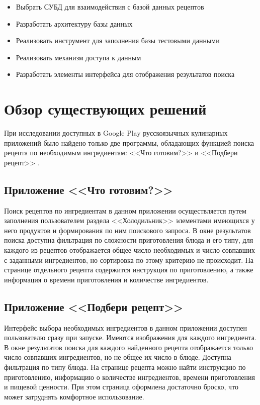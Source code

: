 \documentclass[14pt]{matmex-diploma-custom}
\begin{document}
\begin{itemize}  
\item Выбрать СУБД для взаимодействия с базой данных рецептов
\item Разработать архитектуру базы данных
\item Реализовать инструмент для заполнения базы тестовыми данными
\item Реализовать механизм доступа к данным
\item Разработать элементы интерфейса для отображения результатов поиска
\end{itemize}

\section*{Обзор существующих решений}
При исследовании доступных в Google Play русскоязычных кулинарных приложений было найдено только две программы, обладающих функцией поиска рецепта по необходимым ингредиентам: <<Что готовим?>> \cite{chtogotovim} и <<Подбери рецепт>> \cite{podberi}.
\subsection*{Приложение <<Что готовим?>>}
Поиск рецептов по ингредиентам в данном приложении осуществляется путем заполнения пользователем раздела <<Холодильник>> элементами имеющихся у него продуктов и формирования по ним поискового запроса. В окне результатов поиска доступна фильтрация по сложности приготовления блюда и его типу, для каждого из рецептов отображается общее число необходимых и число совпавших с заданными ингредиентов, но сортировка по этому критерию не происходит. На странице отдельного рецепта содержится инструкция по приготовлению, а также информация о времени приготовления и количестве ингредиентов.
 \subsection*{Приложение <<Подбери рецепт>>}
 Интерфейс выбора необходимых ингредиентов в данном приложении доступен пользователю сразу при запуске. Имеются изображения для каждого ингредиента. В окне результатов поиска для каждого найденного рецепта отображается только число совпавших ингредиентов, но не общее их число в блюде. Доступна фильтрация по типу блюда. На странице рецепта можно найти инструкцию по приготовлению, информацию о количестве ингредиентов, времени приготовления и пищевой ценности.
При этом страница оформлена достаточно броско, что может затруднять комфортное использование.\\
\end{document}
